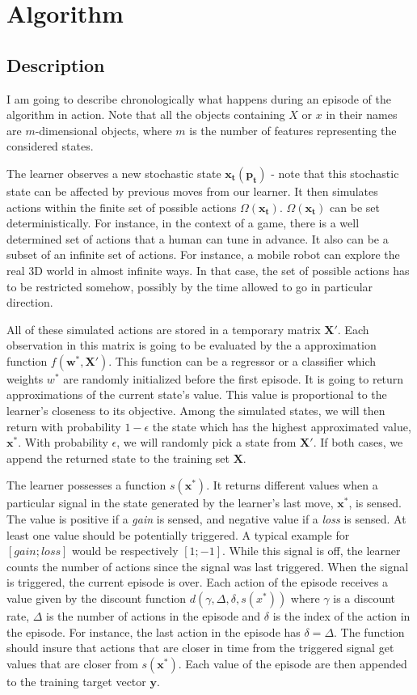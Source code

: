 \documentclass[letterpaper, 10.5 pt, conference]{ieeeconf}
\newcommand{\B}[1]{\mathbf{#1}}
\begin{document}
\section{Algorithm}

\subsection{Description}

I am going to describe chronologically what happens during an episode of the algorithm in action. Note that all the objects containing $X$ or $x$ in their names are $m$-dimensional objects, where $m$ is the number of features representing the considered states.

The learner observes a new stochastic state $\B{x_t(p_t)}$ - note that this stochastic state can be affected by previous moves from our learner. It then simulates actions within the finite set of possible actions $\Omega(\B{x_t})$. $\Omega(\B{x_t})$ can be set deterministically. For instance, in the context of a game, there is a well determined set of actions that a human can tune in advance. It also can be a subset of an infinite set of actions. For instance, a mobile robot can explore the real 3D world in almost infinite ways. In that case, the set of possible actions has to be restricted somehow, possibly by the time allowed to go in particular direction.

All of these simulated actions are stored in a temporary matrix $\B{X'}$. Each observation in this matrix is going to be evaluated by the a approximation function $f(\B{w^*},\B{X'})$. This function can be a regressor or a classifier which weights $w^*$ are randomly initialized before the first episode. It is going to return approximations of the current state's value. This value is proportional to the learner's closeness to its objective. Among the simulated states, we will then return with probability $1-\epsilon$ the state which has the highest approximated value, $\B{x^*}$. With probability $\epsilon$, we will randomly pick a state from $\B{X'}$. If both cases, we append the returned state to the training set $\B{X}$.

The learner possesses a function $s(\B{x^*})$. It returns different values when a particular signal in the state generated by the learner's last move, $\B{x^*}$, is sensed. The value is positive if a \textit{gain} is sensed, and negative value if a \textit{loss} is sensed. At least one value should be potentially triggered. A typical example for $[gain;loss]$ would be respectively $[1;-1]$. While this signal is off, the learner counts the number of actions since the signal was last triggered. When the signal is triggered, the current episode is over. Each action of the episode receives a value given by the discount function $d(\gamma, \Delta, \delta, s(x^*))$ where $\gamma$ is a discount rate, $\Delta$ is the number of actions in the episode and $\delta$ is the index of the action in the episode. For instance, the last action in the episode has $\delta=\Delta$. The function should insure that actions that are closer in time from the triggered signal get values that are closer from $s(\B{x^*})$. Each value of the episode are then appended to the training target vector $\B{y}$. 
\end{document}
